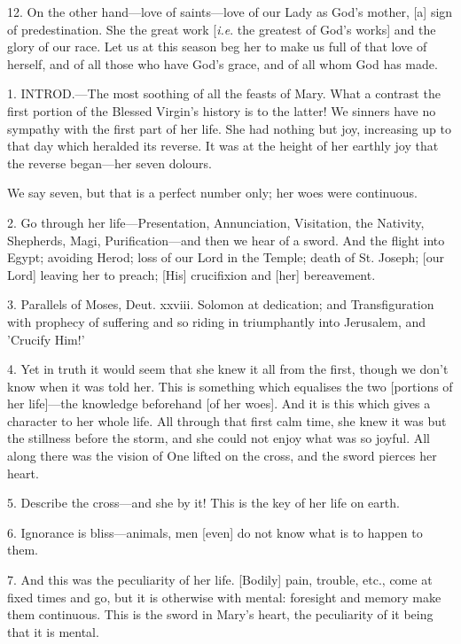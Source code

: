 12. On the other hand—love of saints—love of
our Lady as God's mother, [a] sign of predestination. She the great
work [\emph{i.e}. the greatest of God's works] and the glory of our
race. Let us at this season beg her to make us full of that love of
herself, and of all those who have God's grace, and of all whom God
has made.


1. INTROD.—The
most soothing of all the feasts of Mary. What a contrast the first
portion of the Blessed Virgin's history is to the latter! We sinners
have no sympathy with the first part of her life. She had nothing but
joy, increasing up to that day which heralded its reverse. It was at
the height of her earthly joy that the reverse began—her seven
dolours.

We say seven, but that is a perfect number only;
her woes were continuous.

2. Go through her life—Presentation,
Annunciation, Visitation, the Nativity, Shepherds, Magi,
Purification—and then we hear of a sword. And the flight into Egypt;
avoiding Herod; loss of our Lord in the Temple; death of St. Joseph;
[our Lord] leaving her to preach; [His] crucifixion and [her]
bereavement.

3. Parallels of Moses, Deut. xxviii. Solomon at
dedication; and Transfiguration with prophecy of suffering and so
riding in triumphantly into Jerusalem, and 'Crucify Him!'

4. Yet in truth it would seem that she knew it
all from the first, though we don't know when it was told her. This is
something which equalises the two [portions of her life]—the
knowledge beforehand [of her woes]. And it is this which gives a
character to her whole life. All through that first calm time, she
knew it was but the stillness before the storm, and she could
not enjoy what was so joyful. All along there was the vision of One
lifted on the cross, and the sword pierces her heart.

5. Describe the cross—and she by it! This is
the key of her life on earth.

6. Ignorance is bliss—animals, men [even] do
not know what is to happen to them.

7. And this was the peculiarity of her life.
[Bodily] pain, trouble, etc., come at fixed times and go, but it is
otherwise with mental: foresight and memory make them continuous. This
is the sword in Mary's heart, the peculiarity of it being that it is
mental.

